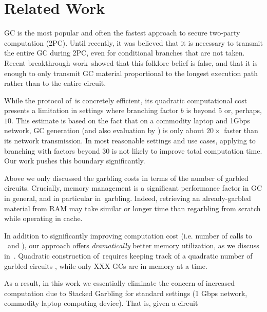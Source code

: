 \section{Related Work}\label{sec:relwork}



GC is the most popular and often the fastest approach to secure two-party computation
(2PC).  Until recently, it was believed that it is necessary
to transmit the entire GC during 2PC, even for conditional branches that
are not taken.  Recent breakthrough work~\HK showed that this folklore belief is false, and that  it is enough to only transmit GC material  proportional to the
longest execution path rather than to the entire circuit.

While the protocol of~\HK is concretely efficient, its quadratic computational cost presents a  limitation in settings where branching factor $b$ is beyond $5$ or, perhaps, $10$.  This estimate is based on the fact that on a commodity laptop and 1Gbps network, GC generation (and also evaluation by \E) is only about $20\times$ faster than its network transmission.  In most reasonable  settings and use cases, applying \HK to branching with factors beyond $30$ is not likely to improve total computation time.  Our work pushes this boundary significantly.

Above we only discussed the garbling costs in terms of the number of garbled circuits.  Crucially, memory management is a significant performance factor in GC in general, and in particular in~\HK garbling.  Indeed, retrieving an already-garbled material from RAM may take similar or longer time than regarbling from scratch while operating in cache.

In addition to significantly improving computation cost (i.e. number of calls to \Gb\ and \Ev), our approach offers {\em dramatically} better memory utilization, as we discuss in~.  Quadratic construction of~\HK requires keeping track of a quadratic number of garbled circuits , while only XXX GCs are in memory at a time.  

As a result, in this work we essentially eliminate the concern of increased computation due to Stacked Garbling for standard settings (1 Gbps network, commodity laptop computing device).   That is, given a circuit



